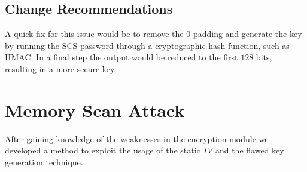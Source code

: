 \section{Change Recommendations}
A quick fix for this issue would be to remove the 0 padding and generate the key by running the SCS password through a cryptographic hash function, such as HMAC. In a final step the output would be reduced to the first $128$ bits, resulting in a more secure key.

\chapter{Memory Scan Attack}
\label{SecMemoryScanAttack}
After gaining knowledge of the weaknesses in the encryption module we developed a method to exploit the usage of the static \emph{IV} and the flawed key generation technique.

